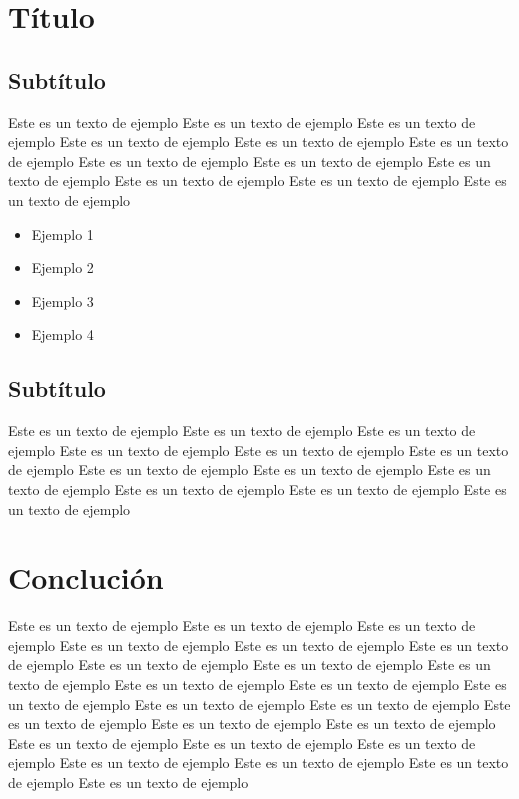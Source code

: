 \documentclass[a4paper, 12pt]{article}
\begin{document}
    \section{Título}
    \subsection{Subtítulo}
    Este es un texto de ejemplo Este es un texto de ejemplo Este es un texto de ejemplo Este es un texto de ejemplo Este es un texto de ejemplo Este es un texto de ejemplo Este es un texto de ejemplo Este es un texto de ejemplo Este es un texto de ejemplo Este es un texto de ejemplo Este es un texto de ejemplo Este es un texto de ejemplo 

    \begin{itemize}
        \item Ejemplo 1
        \item Ejemplo 2
        \item Ejemplo 3
        \item Ejemplo 4
    \end{itemize} 

    \subsection{Subtítulo}
    Este es un texto de ejemplo Este es un texto de ejemplo Este es un texto de ejemplo Este es un texto de ejemplo Este es un texto de ejemplo Este es un texto de ejemplo Este es un texto de ejemplo Este es un texto de ejemplo Este es un texto de ejemplo Este es un texto de ejemplo Este es un texto de ejemplo Este es un texto de ejemplo
    \clearpage

    \section{\textcolor{rojoPortada}{Conclución}}
    Este es un texto de ejemplo Este es un texto de ejemplo Este es un texto de ejemplo Este es un texto de ejemplo Este es un texto de ejemplo Este es un texto de ejemplo Este es un texto de ejemplo Este es un texto de ejemplo Este es un texto de ejemplo Este es un texto de ejemplo Este es un texto de ejemplo Este es un texto de ejemplo Este es un texto de ejemplo Este es un texto de ejemplo Este es un texto de ejemplo Este es un texto de ejemplo Este es un texto de ejemplo Este es un texto de ejemplo Este es un texto de ejemplo Este es un texto de ejemplo Este es un texto de ejemplo Este es un texto de ejemplo Este es un texto de ejemplo Este es un texto de ejemplo 
    \clearpage
\end{document}
